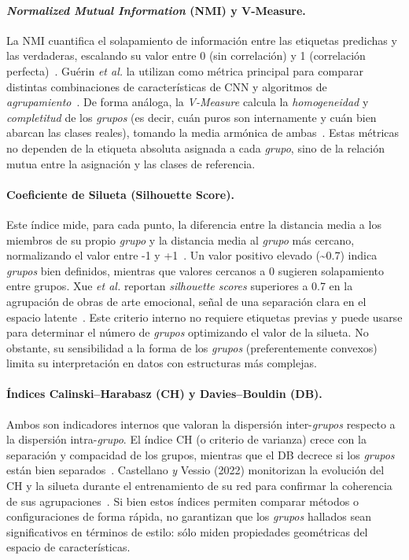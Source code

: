 \paragraph{\emph{Normalized Mutual Information} (NMI) y V-Measure.}
La NMI cuantifica el solapamiento de información entre las etiquetas predichas y las verdaderas, escalando su valor entre 0 (sin correlación) y 1 (correlación perfecta)~\cite{dangeti2024,guerin2018}.
Guérin \textit{et al.} la utilizan como métrica principal para comparar distintas combinaciones de características de CNN y algoritmos de \textit{agrupamiento}~\cite{guerin2018}.
De forma análoga, la \textit{V-Measure} calcula la \emph{homogeneidad} y \emph{completitud} de los \textit{grupos} (es decir, cuán puros son internamente y cuán bien abarcan las clases reales), tomando la media armónica de ambas~\cite{li2010}.
Estas métricas no dependen de la etiqueta absoluta asignada a cada \textit{grupo}, sino de la relación mutua entre la asignación y las clases de referencia.

\paragraph{Coeficiente de Silueta (Silhouette Score).}
Este índice mide, para cada punto, la diferencia entre la distancia media a los miembros de su propio \textit{grupo} y la distancia media al \textit{grupo} más cercano, normalizando el valor entre -1 y +1~\cite{dangeti2024,gultepe2018}.
Un valor positivo elevado (\textasciitilde 0.7) indica \textit{grupos} bien definidos, mientras que valores cercanos a 0 sugieren solapamiento entre grupos.
Xue \textit{et al.} reportan \textit{silhouette scores} superiores a 0.7 en la agrupación de obras de arte emocional, señal de una separación clara en el espacio latente~\cite{gultepe2018}.
Este criterio interno no requiere etiquetas previas y puede usarse para determinar el número de \textit{grupos} optimizando el valor de la silueta.
No obstante, su sensibilidad a la forma de los \textit{grupos} (preferentemente convexos) limita su interpretación en datos con estructuras más complejas.

\paragraph{Índices Calinski–Harabasz (CH) y Davies–Bouldin (DB).}
Ambos son indicadores internos que valoran la dispersión inter-\textit{grupos} respecto a la dispersión intra-\textit{grupo}.
El índice CH (o criterio de varianza) crece con la separación y compacidad de los grupos, mientras que el DB decrece si los \textit{grupos} están bien separados~\cite{dangeti2024}.
Castellano \textit{y} Vessio (2022) monitorizan la evolución del CH y la silueta durante el entrenamiento de su red para confirmar la coherencia de sus agrupaciones~\cite{castellano2022}.
Si bien estos índices permiten comparar métodos o configuraciones de forma rápida, no garantizan que los \textit{grupos} hallados sean significativos en términos de estilo: sólo miden propiedades geométricas del espacio de características.

